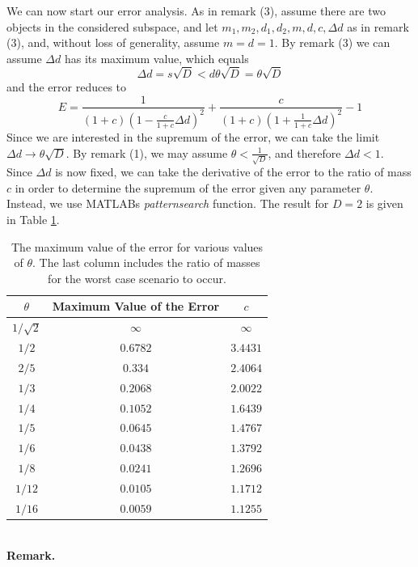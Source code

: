 We can now start our error analysis.
As in remark (3), assume there are two objects in the considered subspace, and let $m_1,m_2,d_1,d_2,m,d,c,\Delta d$ as in remark (3), and, without loss of generality, assume $m = d = 1$. By remark (3) we can assume $\Delta d$ has its maximum value, which equals
\[
\Delta d = s\sqrt{D} < d\theta \sqrt{D} = \theta\sqrt{D}
\]
and the error reduces to
\[
E = \frac{1}{(1+c)(1-\frac{c}{1+c}\Delta d)^2}+\frac{c}{(1+c)(1+\frac{1}{1+c}\Delta d)^2}-1
\]
Since we are interested in the supremum of the error, we can take the limit $\Delta d \rightarrow \theta \sqrt{D}$. By remark (1), we may assume $\theta < \frac{1}{\sqrt{D}}$, and therefore $\Delta d<1$.\\
Since $\Delta d$ is now fixed, we can take the derivative of the error to the ratio of mass $c$ in order to determine the supremum of the error given any parameter $\theta$. Instead, we use MATLABs \textit{patternsearch} function. The result for $D=2$ is given in Table \ref{tab:maxerror}.
\begin{table}[h!]
\centering
\caption{The maximum value of the error for various values of $\theta$. The last column includes the ratio of masses for the worst case scenario to occur.}
\label{tab:maxerror}
\begin{tabular}{c|c|c}
$\theta$ & Maximum Value of the Error & $c$\\
\hline
$1/\sqrt{2}$ & $\infty$ & $\infty$\\
$1/2$ & $0.6782$ & $3.4431$\\
$2/5$ & $0.334$ & $2.4064$\\
$1/3$ & $0.2068$ & $2.0022$\\
$1/4$ & $0.1052$ & $1.6439$\\
$1/5$ & $0.0645$ & $1.4767$\\
$1/6$ & $0.0438$ & $1.3792$\\
$1/8$ & $0.0241$ & $1.2696$\\
$1/12$ & $0.0105$ & $1.1712$\\
$1/16$ & $0.0059$ & $1.1255$ 
\end{tabular}
\end{table}\\
\textbf{Remark.}
